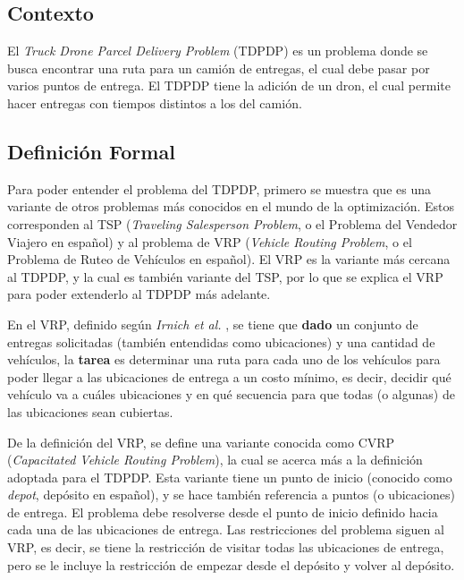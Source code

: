 
\subsection{Contexto}

El \textit{Truck Drone Parcel Delivery Problem} (TDPDP) es un problema donde se busca encontrar una ruta para un camión de entregas, el cual debe pasar por varios puntos de entrega. El TDPDP tiene la adición de un dron, el cual permite hacer entregas con tiempos distintos a los del camión.

\subsection{Definición Formal}

Para poder entender el problema del TDPDP, primero se muestra que es una variante de otros problemas más conocidos en el mundo de la optimización. Estos corresponden al TSP (\textit{Traveling Salesperson Problem}, o el Problema del Vendedor Viajero en español) y al problema de VRP (\textit{Vehicle Routing Problem}, o el Problema de Ruteo de Vehículos en español). El VRP es la variante más cercana al TDPDP, y la cual es también variante del TSP, por lo que se explica el VRP para poder extenderlo al TDPDP más adelante.

En el VRP, definido según \textit{Irnich et al.} \cite{Irnich2014FamilyVRP}, se tiene que \textbf{dado} un conjunto de entregas solicitadas (también entendidas como ubicaciones) y una cantidad de vehículos, la \textbf{tarea} es determinar una ruta para cada uno de los vehículos para poder llegar a las ubicaciones de entrega a un costo mínimo, es decir, decidir qué vehículo va a cuáles ubicaciones y en qué secuencia para que todas (o algunas) de las ubicaciones sean cubiertas. 

De la definición del VRP, se define una variante conocida como CVRP (\textit{Capacitated Vehicle Routing Problem}), la cual se acerca más a la definición adoptada para el TDPDP. Esta variante tiene un punto de inicio (conocido como \textit{depot}, depósito en español), y se hace también referencia a puntos (o ubicaciones) de entrega. El problema debe resolverse desde el punto de inicio definido hacia cada una de las ubicaciones de entrega. Las restricciones del problema siguen al VRP, es decir, se tiene la restricción de visitar todas las ubicaciones de entrega, pero se le incluye la restricción de empezar desde el depósito y volver al depósito.

